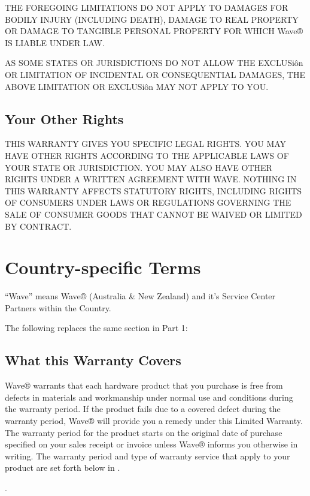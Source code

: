 \documentclass[letterpaper,10pt,openany,oneside,english]{sphinxmanual}
\begin{document}
THE FOREGOING LIMITATIONS DO NOT APPLY TO DAMAGES FOR BODILY INJURY (INCLUDING DEATH), DAMAGE TO REAL PROPERTY OR DAMAGE TO TANGIBLE PERSONAL PROPERTY FOR WHICH Wave® IS LIABLE UNDER LAW.

AS SOME STATES OR JURISDICTIONS DO NOT ALLOW THE EXCLUSiôn OR LIMITATION OF INCIDENTAL OR CONSEQUENTIAL DAMAGES, THE ABOVE LIMITATION OR EXCLUSiôn MAY NOT APPLY TO YOU.


\subsection{Your Other Rights}
\label{\detokenize{part1:your-other-rights}}
THIS WARRANTY GIVES YOU SPECIFIC LEGAL RIGHTS. YOU MAY HAVE OTHER RIGHTS ACCORDING TO THE APPLICABLE LAWS OF YOUR STATE OR JURISDICTION. YOU MAY ALSO HAVE OTHER RIGHTS UNDER A WRITTEN AGREEMENT WITH WAVE. NOTHING IN THIS WARRANTY AFFECTS STATUTORY RIGHTS, INCLUDING RIGHTS OF CONSUMERS UNDER LAWS OR REGULATIONS GOVERNING THE SALE OF CONSUMER GOODS THAT CANNOT BE WAIVED OR LIMITED BY CONTRACT.


\section{Country-specific Terms}
\label{\detokenize{part2:country-specific-terms}}\label{\detokenize{part2::doc}}
“Wave” means Wave® (Australia \& New Zealand) and it’s Service Center Partners within the Country.

The following replaces the same section in Part 1:


\subsection{What this Warranty Covers}
\label{\detokenize{part2:what-this-warranty-covers}}
Wave® warrants that each hardware product that you purchase is free from defects in materials and workmanship under normal use and conditions during the warranty period. If the product fails due to a covered defect during the warranty period, Wave® will provide you a remedy under this Limited Warranty. The warranty period for the product starts on the original date of purchase specified on your sales receipt or invoice unless Wave® informs you otherwise in writing. The warranty period and type of warranty service that apply to your product are set forth below in .

.
\end{document}
